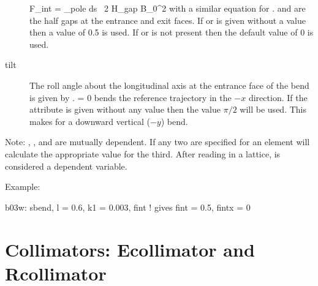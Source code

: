 \begin{description}
\Begineq
  F_{int} = \int_{pole} \! \! ds \, 
  {2 H_{gap} B_0^2}
\Endeq
with a similar equation for .  and  are
the half gaps at the entrance and exit faces. If  or
 is given without a value then a value of 0.5 is used. If
 or  is not present then the default value of 0 is
used.
  \item[tilt]
The roll angle about the longitudinal axis at the entrance face of the
bend is given by .   = 0 bends the reference
trajectory in the $-x$ direction.  If the  attribute is given
without any value then the value $\pi/2$ will be used. This makes for
a downward vertical ($-y$) bend.
  \end{description}


Note: , , and  are mutually dependent. If any two are
specified for an element \bmad will calculate the appropriate value
for the third.  After reading in a lattice,  is considered a
dependent variable.

Example:
\begin{example}
  b03w: sbend, l = 0.6, k1 = 0.003, fint  ! gives fint = 0.5, fintx = 0
\end{example}

\section{Collimators: Ecollimator and Rcollimator}
\label{s:col}

